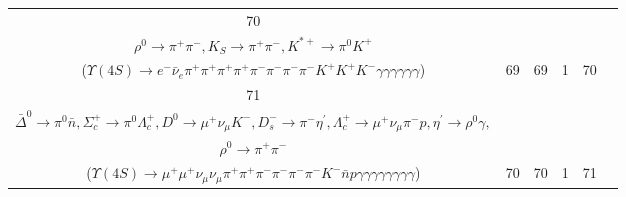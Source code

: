 \documentclass[landscape]{article}
\begin{document}
\begin{table}[htbp!]
\begin{tabular}{|c|c|c|c|c|c|}
\hline
70 & \makecell{ $ 
\Upsilon(4S) \rightarrow B^{0} \bar{B}^{0} ,
B^{0} \rightarrow \rho^{+} K^{+} K^{-} D^{-} ,
\bar{B}^{0} \rightarrow \pi^{0} \pi^{+} \pi^{-} \pi^{-} D^{+} ,
\rho^{+} \rightarrow \pi^{0} \pi^{+} ,
D^{-} \rightarrow e^{-} \bar{\nu}_{e} \rho^{0} ,
D^{+} \rightarrow K_{S} K^{*+} ,
$ \\ $
\rho^{0} \rightarrow \pi^{+} \pi^{-} ,
K_{S} \rightarrow \pi^{+} \pi^{-} ,
K^{*+} \rightarrow \pi^{0} K^{+} 
$ \\ ($
\Upsilon(4S) \rightarrow e^{-} \bar{\nu}_{e} \pi^{+} \pi^{+} \pi^{+} \pi^{+} \pi^{-} \pi^{-} \pi^{-} \pi^{-} K^{+} K^{+} K^{-} \gamma \gamma \gamma \gamma \gamma \gamma 
$) } & 69 & 69 & 1 & 70 \\
\hline
71 & \makecell{ $ 
\Upsilon(4S) \rightarrow \bar{B}^{0} \bar{B}^{0} ,
\bar{B}^{0} \rightarrow D^{*+} D_{s}^{*-} ,
\bar{B}^{0} \rightarrow \rho^{-} \bar{\Delta}^{0} \Sigma_{c}^{+} ,
D^{*+} \rightarrow \pi^{+} D^{0} ,
D_{s}^{*-} \rightarrow D_{s}^{-} \gamma ,
\rho^{-} \rightarrow \pi^{0} \pi^{-} ,
$ \\ $
\bar{\Delta}^{0} \rightarrow \pi^{0} \bar{n} ,
\Sigma_{c}^{+} \rightarrow \pi^{0} \Lambda_{c}^{+} ,
D^{0} \rightarrow \mu^{+} \nu_{\mu} K^{-} ,
D_{s}^{-} \rightarrow \pi^{-} \eta^{\prime} ,
\Lambda_{c}^{+} \rightarrow \mu^{+} \nu_{\mu} \pi^{-} p ,
\eta^{\prime} \rightarrow \rho^{0} \gamma ,
$ \\ $
\rho^{0} \rightarrow \pi^{+} \pi^{-} 
$ \\ ($
\Upsilon(4S) \rightarrow \mu^{+} \mu^{+} \nu_{\mu} \nu_{\mu} \pi^{+} \pi^{+} \pi^{-} \pi^{-} \pi^{-} \pi^{-} K^{-} \bar{n} p \gamma \gamma \gamma \gamma \gamma \gamma \gamma \gamma 
$) } & 70 & 70 & 1 & 71 \\
\hline
\end{tabular}
\end{table}

\clearpage
\end{document}
